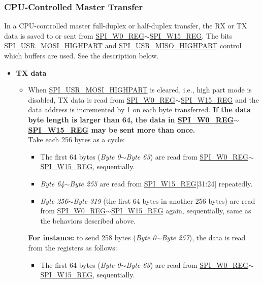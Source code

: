 \documentclass[main\_\_EN.tex]{subfiles}
\begin{document}
\subsubsection{CPU-Controlled Master Transfer} \label{GP-SPI Master CPU}

In a CPU-controlled master full-duplex or half-duplex transfer, the RX or TX data is saved to or sent from \hyperref[regdesc:SPIW0REG]{SPI\_W0\_REG}$\sim$\hyperref[regdesc:SPIW15REG]{SPI\_W15\_REG}. The bits \hyperref[fielddesc:SPIUSRMOSIHIGHPART]{SPI\_USR\_MOSI\_HIGHPART} and \hyperref[fielddesc:SPIUSRMISOHIGHPART]{SPI\_USR\_MISO\_HIGHPART} control which buffers are used. See the description below.

\begin{itemize}
    \item \textbf{TX data}
    \begin{itemize}
        \item When \hyperref[fielddesc:SPIUSRMOSIHIGHPART]{SPI\_USR\_MOSI\_HIGHPART} is cleared, i.e., high part mode is disabled, TX data is read from \hyperref[regdesc:SPIW0REG]{SPI\_W0\_REG}$\sim$\hyperref[regdesc:SPIW15REG]{SPI\_W15\_REG} and the data address is incremented by 1 on each byte transferred. \textbf{If the data byte length is larger than 64, the data in \hyperref[regdesc:SPIW0REG]{SPI\_W0\_REG}$\sim$\hyperref[regdesc:SPIW15REG]{SPI\_W15\_REG} may be sent more than once.} \\ 
        Take each 256 bytes as a cycle:
        \begin{itemize}
            \item The first 64 bytes (\emph{Byte 0}$\sim$\emph{Byte 63}) are read from \hyperref[regdesc:SPIW0REG]{SPI\_W0\_REG}$\sim$\hyperref[regdesc:SPIW15REG]{SPI\_W15\_REG}, sequentially.
            \item \emph{Byte 64}$\sim$\emph{Byte 255} are read from \hyperref[regdesc:SPIW15REG]{SPI\_W15\_REG}[31:24] repeatedly.
            \item \emph{Byte 256}$\sim$\emph{Byte 319} (the first 64 bytes in another 256 bytes) are read from \hyperref[regdesc:SPIW0REG]{SPI\_W0\_REG}$\sim$\hyperref[regdesc:SPIW15REG]{SPI\_W15\_REG} again, sequentially, same as the behaviors described above.
        \end{itemize}
        \textbf{For instance:} to send 258 bytes (\emph{Byte 0}$\sim$\emph{Byte 257}), the data is read from the registers as follows:
        \begin{itemize}
            \item The first 64 bytes (\emph{Byte 0}$\sim$\emph{Byte 63}) are read from \hyperref[regdesc:SPIW0REG]{SPI\_W0\_REG}$\sim$\hyperref[regdesc:SPIW15REG]{SPI\_W15\_REG}, sequentially.

\end{itemize}
\end{itemize}
\end{itemize}
\end{document}
